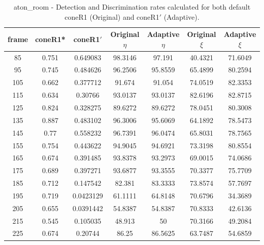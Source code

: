 \begin{appendices}
\begin{table}
\begin{tabular}{ |c|c|c|c|c|c|c| }
\end{tabular}

\end{table}

\begin{table}
\centering
\caption{aton\_room - Detection and Discrimination rates calculated for both default coneR1 (Original) and coneR1$'$ (Adaptive).}
\begin{tabular}{ |c|c|c|c|c|c|c| }
\hline
\textbf{frame} &  \textbf{coneR1*} &  \textbf{coneR1$'$} &  \textbf{Original $\eta$} &  \textbf{Adaptive $\eta$} &  \textbf{Original $\xi$} &  \textbf{Adaptive $\xi$} \\
\hline
\hline
85 &  0.751 &  0.649083 &  98.3146 &  97.191 &  40.4321 &  71.6049 \\
\hline
95 &  0.745 &  0.484626 &  96.2506 &  95.8559 &  65.4899 &  80.2594 \\
\hline
105 &  0.662 &  0.377712 &  91.674 &  91.054 &  74.0519 &  82.3353 \\
\hline
115 &  0.634 &  0.30766 &  93.0137 &  93.0137 &  82.6196 &  82.8715 \\
\hline
125 &  0.824 &  0.328275 &  89.6272 &  89.6272 &  78.0451 &  80.3008 \\
\hline
135 &  0.887 &  0.483102 &  96.3006 &  95.6069 &  64.1892 &  78.5473 \\
\hline
145 &  0.77 &  0.558232 &  96.7391 &  96.0474 &  65.8031 &  78.7565 \\
\hline
155 &  0.754 &  0.443622 &  94.9045 &  94.6921 &  73.3198 &  80.8554 \\
\hline
165 &  0.674 &  0.391485 &  93.8378 &  93.2973 &  69.0015 &  74.0686 \\
\hline
175 &  0.689 &  0.397271 &  93.6877 &  93.3555 &  70.3377 &  75.7709 \\
\hline
185 &  0.712 &  0.147542 &  82.381 &  83.3333 &  73.8574 &  57.7697 \\
\hline
195 &  0.719 &  0.0423129 &  61.1111 &  64.8148 &  70.6796 &  34.3689 \\
\hline
205 &  0.655 &  0.0391442 &  54.8387 &  54.8387 &  70.8333 &  42.6136 \\
\hline
215 &  0.545 &  0.105035 &  48.913 &  50 &  70.3166 &  49.2084 \\
\hline
225 &  0.674 &  0.20744 &  86.25 &  86.5625 &  63.7487 &  54.6859 \\

\end{tabular}
\end{table}
\end{appendices}
